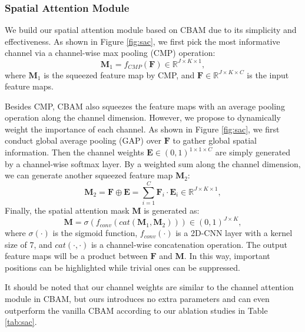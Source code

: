 \documentclass[acmsmall,screen]{acmart}
\def \mbf{\mathbf}
\begin{document}
\subsubsection{Spatial Attention Module}
We build our spatial attention module based on CBAM \cite{woo2018cbam} due to its simplicity and effectiveness.
As shown in Figure \ref{fig:sac}, we first pick the most informative channel via a channel-wise max pooling (CMP) operation:
\begin{equation}
    \mbf{M}_1 = f_{CMP}(\mbf{F}) \in \mathbb{R}^{J\times K\times 1},
\label{eq:1}
\end{equation}
where $\mbf{M}_1$ is the squeezed feature map by CMP, and $\mbf{F}\in\mathbb{R}^{J\times K \times C}$ is the input feature maps.

Besides CMP, CBAM also squeezes the feature maps with an average pooling operation along the channel dimension. 
However, we propose to dynamically weight the importance of each channel.
As shown in Figure \ref{fig:sac}, we first conduct global average pooling (GAP) over $\mbf{F}$ to gather global spatial information. 
Then the channel weights $\mbf{E}\in (0,1)^{1\times 1 \times C}$ are simply generated by a channel-wise softmax layer.
By a weighted sum along the channel dimension, we can generate another squeezed feature map $\mbf{M}_2$:
\begin{equation}
    \mbf{M}_2 = \mbf{F} \oplus \mbf{E} = \sum_{i=1}^C \mbf{F}_i \cdot \mbf{E}_i \in \mathbb{R}^{J\times K\times 1},
\end{equation}
Finally, the spatial attention mask $\mbf{M}$ is generated as:
\begin{equation}
    \mbf{M} = \sigma (f_{conv}(cat(\mbf{M}_1, \mbf{M}_2))) \in (0,1)^{J\times K},
\end{equation}
where $\sigma(\cdot)$ is the sigmoid function, $f_{conv}(\cdot)$ is a 2D-CNN layer with a kernel size of 7, and $cat(\cdot,\cdot)$ is a channel-wise concatenation operation. 
The output feature maps will be a product between $\mbf{F}$ and $\mbf{M}$.
In this way, important positions can be highlighted while trivial ones can be suppressed.

It should be noted that our channel weights are similar to the channel attention module in CBAM, but ours introduces no extra parameters and can even outperform the vanilla CBAM according to our ablation studies in Table \ref{tab:sac}.
\end{document}
